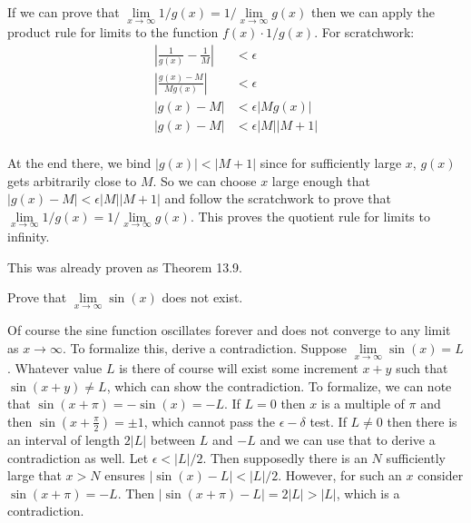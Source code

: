 \documentclass{article}
\begin{document}
If we can prove that $\lim\limits_{x\to\infty} 1/g(x) = 1/\lim\limits_{x\to\infty} g(x)$ then we can apply the product rule for limits to the function $f(x) \cdot 1/g(x)$. For scratchwork:
\begin{align*}
  \left|\frac{1}{g(x)} - \frac{1}{M}\right| & < \epsilon            \\
  \left|\frac{g(x) - M}{Mg(x)}\right|       & < \epsilon            \\
  \left|g(x) - M\right|                     & < \epsilon |Mg(x)|    \\
  \left|g(x) - M\right|                     & < \epsilon |M||M + 1| \\
\end{align*}

At the end there, we bind $|g(x)| < |M + 1|$ since for sufficiently large $x$, $g(x)$ gets arbitrarily close to $M$. So we can choose $x$ large enough that $|g(x) - M| < \epsilon |M||M + 1|$ and follow the scratchwork to prove that $\lim\limits_{x\to\infty} 1/g(x) = 1/\lim\limits_{x\to\infty} g(x)$. This proves the quotient rule for limits to infinity.

\begin{problem}
This was already proven as Theorem 13.9.
\end{problem}

\begin{problem}
Prove that $\lim\limits_{x\to\infty} \sin(x)$ does not exist.
\end{problem}

Of course the sine function oscillates forever and does not converge to any limit as $x \to \infty$. To formalize this, derive a contradiction. Suppose $\lim\limits_{x\to\infty} \sin(x) = L$. Whatever value $L$ is there of course will exist some increment $x + y$ such that $\sin(x + y) \neq L$, which can show the contradiction. To formalize, we can note that $\sin(x + \pi) = -\sin(x) = -L$. If $L = 0$ then $x$ is a multiple of $\pi$ and then $\sin(x + \frac{\pi}{2}) = \pm 1$, which cannot pass the $\epsilon-\delta$ test. If $L \neq 0$ then there is an interval of length $2|L|$ between $L$ and $-L$ and we can use that to derive a contradiction as well. Let $\epsilon < |L|/2$. Then supposedly there is an $N$ sufficiently large that $x > N$ ensures $|\sin(x) - L| < |L|/2$. However, for such an $x$ consider $\sin(x + \pi) = -L$. Then $|\sin(x + \pi) - L| = 2|L| > |L|$, which is a contradiction.
\end{document}
